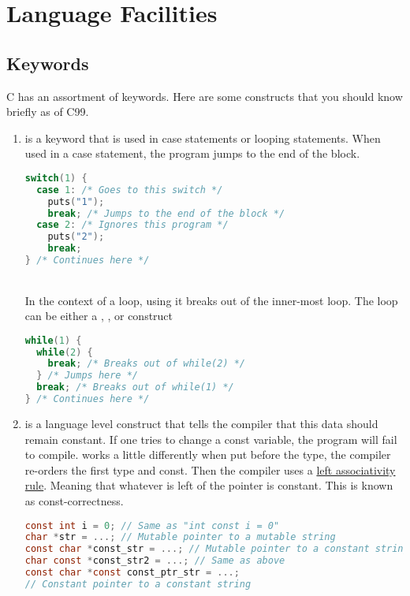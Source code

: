 \section{Language Facilities}

\subsection{Keywords}

C has an assortment of keywords.
Here are some constructs that you should know briefly as of C99.


\begin{enumerate}
\item {} is a keyword that is used in case statements or looping statements.
  When used in a case statement, the program jumps to the end of the block.
	      \\
\begin{lstlisting}[language=C]
switch(1) {
  case 1: /* Goes to this switch */
    puts("1");
    break; /* Jumps to the end of the block */
  case 2: /* Ignores this program */
    puts("2");
    break;
} /* Continues here */
\end{lstlisting}
	      \\
	      In the context of a loop, using it breaks out of the inner-most loop.
        The loop can be either a , , or  construct
	      \\
\begin{lstlisting}[language=C]
while(1) {
  while(2) {
    break; /* Breaks out of while(2) */
  } /* Jumps here */
  break; /* Breaks out of while(1) */
} /* Continues here */
\end{lstlisting}
	    \item {} is a language level construct that tells the compiler that this data should remain constant.
        If one tries to change a const variable, the program will fail to compile.
         works a little differently when put before the type, the compiler re-orders the first type and const.
        Then the compiler uses a \href{https://en.wikipedia.org/wiki/Operator_associativity}{left associativity rule}.
        Meaning that whatever is left of the pointer is constant.
        This is known as const-correctness.
	      \\
\begin{lstlisting}[language=C]
const int i = 0; // Same as "int const i = 0"
char *str = ...; // Mutable pointer to a mutable string
const char *const_str = ...; // Mutable pointer to a constant string
char const *const_str2 = ...; // Same as above
const char *const const_ptr_str = ...;
// Constant pointer to a constant string
\end{lstlisting}


\end{enumerate}
